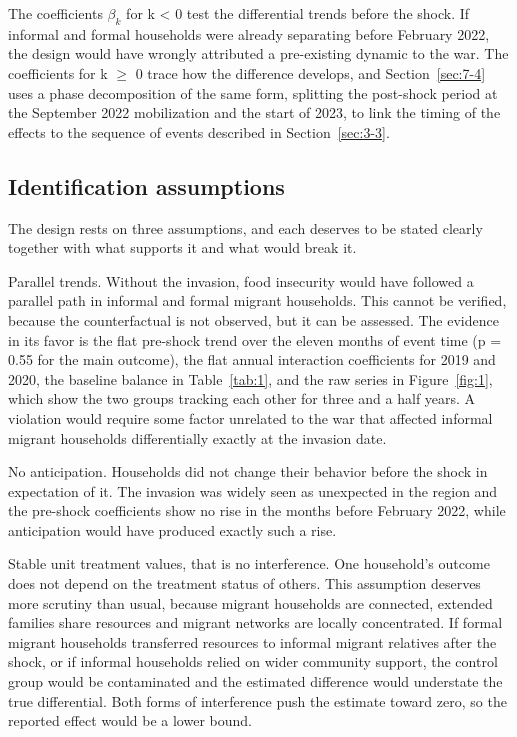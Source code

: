 The coefficients $\beta_{k}$ for k < 0 test the differential trends before the shock. If informal and formal households were already separating before February 2022, the design would have wrongly attributed a pre-existing dynamic to the war. The coefficients for k $\geq$ 0 trace how the difference develops, and Section~\ref{sec:7-4} uses a phase decomposition of the same form, splitting the post-shock period at the September 2022 mobilization and the start of 2023, to link the timing of the effects to the sequence of events described in Section~\ref{sec:3-3}.

\subsection{Identification assumptions}\label{sec:6-5}

The design rests on three assumptions, and each deserves to be stated clearly together with what supports it and what would break it.

Parallel trends. Without the invasion, food insecurity would have followed a parallel path in informal and formal migrant households. This cannot be verified, because the counterfactual is not observed, but it can be assessed. The evidence in its favor is the flat pre-shock trend over the eleven months of event time (p = 0.55 for the main outcome), the flat annual interaction coefficients for 2019 and 2020, the baseline balance in Table~\ref{tab:1}, and the raw series in Figure~\ref{fig:1}, which show the two groups tracking each other for three and a half years. A violation would require some factor unrelated to the war that affected informal migrant households differentially exactly at the invasion date.

No anticipation. Households did not change their behavior before the shock in expectation of it. The invasion was widely seen as unexpected in the region and the pre-shock coefficients show no rise in the months before February 2022, while anticipation would have produced exactly such a rise.

Stable unit treatment values, that is no interference. One household's outcome does not depend on the treatment status of others. This assumption deserves more scrutiny than usual, because migrant households are connected, extended families share resources and migrant networks are locally concentrated. If formal migrant households transferred resources to informal migrant relatives after the shock, or if informal households relied on wider community support, the control group would be contaminated and the estimated difference would understate the true differential. Both forms of interference push the estimate toward zero, so the reported effect would be a lower bound.

